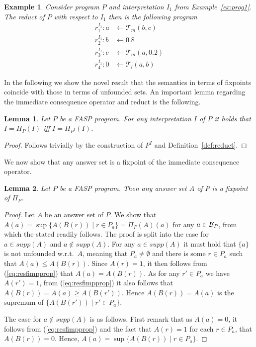 \documentclass{tlp}
\newcommand{\hbase}[1]{{\ensuremath{{\cal B}_{#1}}}}
\newcommand{\body}[1]{\ensuremath{B(#1)}}
\newcommand{\supp}[1]{\ensuremath{\mathit{supp}(#1)}}
\newcommand{\pretnorm}{\mathcal{T}}
\newcommand{\nfimcons}[1]{\Pi_{#1}}
\newtheorem{example}{Example}
\newtheorem{lemma}{Lemma}
\begin{document}
\begin{example}\label{ex:prog1-reduct}
Consider program $P$ and interpretation $I_1$ from Example~\ref{ex:prog1}. The reduct of $P$ with respect to $I_1$ then is the following program
 \begin{align*}
   r_{1}^{I_{1}}: a &\gets \pretnorm_{m}(b,c)\\
  r_{2}^{I_{1}}: b &\gets 0.8\\
  r_{3}^{I_{1}}: c &\gets \pretnorm_{m}(a,0.2)\\
  r_{4}^{I_{1}}: 0 &\gets \pretnorm_{l}(a,b)
 \end{align*}
\end{example}

In the following we show the novel result that the semantics in terms of fixpoints coincide with those in terms of unfounded sets.
An important lemma regarding the immediate consequence operator and reduct is the following.

\begin{lemma}\label{lem:notmodel-lfviolated}
 Let $P$ be a FASP program. For any interpretation $I$ of $P$ it holds that $I = \nfimcons{P}(I)$ iff $I = \nfimcons{P^I}(I)$.
\end{lemma}
\begin{proof}
 Follows trivially by the construction of $P^I$ and Definition~\ref{def:reduct}.
\end{proof}

We now show that any answer set is a fixpoint of the immediate consequence operator.

\begin{lemma}\label{lem:unfounded-fixpoint}
 Let $P$ be a FASP program. Then any answer set $A$ of $P$ is a fixpoint of $\nfimcons{P}$.
\end{lemma}
\begin{proof}
 Let $A$ be an answer set of $P$. We show that $A(a) = \sup \{ A(\body{r}) \mid r \in P_a \} = \nfimcons{P}(A)(a)$ for any $a \in \hbase{P}$, from which the stated readily follows. The proof is split into the case for $a \in \supp{A}$ and $a \not\in \supp{A}$. For any $a \in \supp{A}$ it must hold that $\{a\}$ is not unfounded w.r.t.~$A$,
 meaning that $P_a \neq \emptyset$ and there is some $r \in P_a$ such that $A(a) \leq A(\body{r})$. Since $A(r) = 1$, it then follows from (\ref{eq:resfimpprop}) that $A(a) = A(\body{r})$. As for any $r' \in P_a$ we have $A(r') = 1$, from (\ref{eq:resfimpprop}) it also follows that $A(\body{r}) = A(a) \geq A(\body{r'})$. Hence $A(\body{r}) = A(a)$ is the supremum of $\{ A(\body{r'}) \mid r' \in P_a \}$.

 The case for $a \not\in \supp{A}$ is as follows. First remark that as $A(a) = 0$, it follows from (\ref{eq:resfimpprop}) and the fact that $A(r) = 1$ for each $r \in P_a$, that $A(\body{r}) = 0$. Hence, $A(a) = \sup \{ A(\body{r}) \mid r \in P_a \}$. 
\end{proof}
\end{document}
